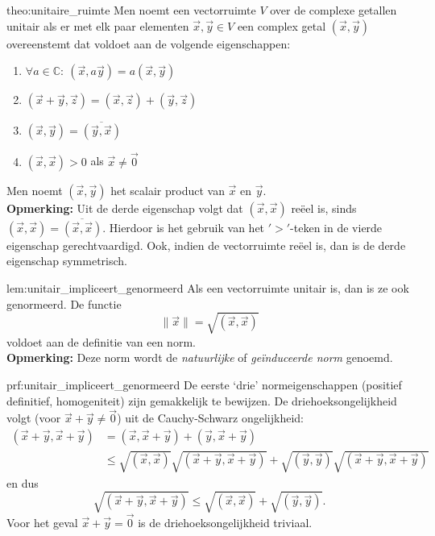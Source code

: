 \begin{theo}{theo:unitaire_ruimte}
    Men noemt een vectorruimte $V$ over de complexe getallen unitair als er met elk paar elementen $\vec{x}, \vec{y} \in V$ een complex getal $(\vec{x},\vec{y})$ overeenstemt dat voldoet aan de volgende eigenschappen:
    \begin{enumerate}
        \item $\forall a \in \mathbb{C}: \ (\vec{x},a\vec{y}) = a(\vec{x},\vec{y})$
        \item $(\vec{x} + \vec{y},\vec{z}) = (\vec{x},\vec{z}) + (\vec{y},\vec{z})$
        \item $(\vec{x},\vec{y}) = \overline{(\vec{y},\vec{x})}$
        \item $(\vec{x},\vec{x}) > 0$ als $\vec{x} \neq \vec{0}$
    \end{enumerate}
    Men noemt $(\vec{x},\vec{y})$ het scalair product van $\vec{x}$ en $\vec{y}$. \\

    \textbf{Opmerking:} Uit de derde eigenschap volgt dat $(\vec{x},\vec{x})$ reëel is, sinds $(\vec{x},\vec{x}) = \overline{(\vec{x},\vec{x})}$. Hierdoor is het gebruik van het $'>'$-teken in de vierde eigenschap gerechtvaardigd. Ook, indien de vectorruimte reëel is, dan is de derde eigenschap symmetrisch.
\end{theo}

\begin{lem}{lem:unitair_impliceert_genormeerd}
    Als een vectorruimte unitair is, dan is ze ook genormeerd. De functie
    \begin{equation*}
        \| \vec{x} \| = \sqrt{(\vec{x},\vec{x})}
    \end{equation*}
    voldoet aan de definitie van een norm. \\

    \textbf{Opmerking:} Deze norm wordt de \emph{natuurlijke} of \emph{geïnduceerde norm} genoemd. 
\end{lem}

\newpage

\begin{prf}{prf:unitair_impliceert_genormeerd}
    De eerste `drie' normeigenschappen (positief definitief, homogeniteit) zijn gemakkelijk te bewijzen. De driehoeksongelijkheid volgt (voor $\vec{x} + \vec{y} \neq \vec{0}$) uit de Cauchy-Schwarz ongelijkheid:
    \begin{align*}
        (\vec{x} + \vec{y},\vec{x} + \vec{y}) 
            &= (\vec{x}, \vec{x} + \vec{y}) + (\vec{y}, \vec{x} + \vec{y}) \\
            &\leq \sqrt{(\vec{x},\vec{x})} \sqrt{(\vec{x} + \vec{y},\vec{x} + \vec{y})} + \sqrt{(\vec{y},\vec{y})} \sqrt{(\vec{x} + \vec{y},\vec{x} + \vec{y})} 
    \end{align*}
    en dus
    \begin{equation*}
        \sqrt{(\vec{x} + \vec{y},\vec{x} + \vec{y})} \leq \sqrt{(\vec{x},\vec{x})} + \sqrt{(\vec{y},\vec{y})}.
    \end{equation*}
    Voor het geval $\vec{x} + \vec{y} = \vec{0}$ is de driehoeksongelijkheid triviaal.
\end{prf}

